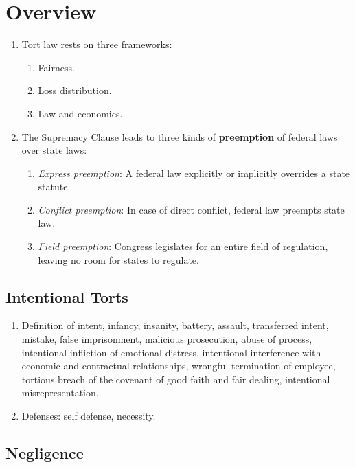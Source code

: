 \section{Overview}

\begin{enumerate}
    \item Tort law rests on three frameworks:
    \begin{enumerate}
        \item Fairness.
        \item Loss distribution.
        \item Law and economics.
    \end{enumerate}
    \item The Supremacy Clause leads to three kinds of 
    \textbf{preemption} of federal laws over state laws:
    \begin{enumerate}
        \item \emph{Express preemption}: A federal law explicitly or 
        implicitly overrides a state statute.
        \item \emph{Conflict preemption}: In case of direct conflict, 
        federal law preempts state law.
        \item \emph{Field preemption}: Congress legislates for an entire 
        field of regulation, leaving no room for states to regulate.
    \end{enumerate}
\end{enumerate}

\subsection{Intentional Torts}

\begin{enumerate}
    \item Definition of intent, infancy, insanity, battery, assault, 
    transferred intent, mistake, false imprisonment, malicious prosecution, 
    abuse of process, intentional infliction of emotional distress, 
    intentional interference with economic and contractual relationships, 
    wrongful termination of employee, tortious breach of the covenant of good 
    faith and fair dealing, intentional misrepresentation.
    \item Defenses: self defense, necessity.
\end{enumerate}

\subsection{Negligence}

